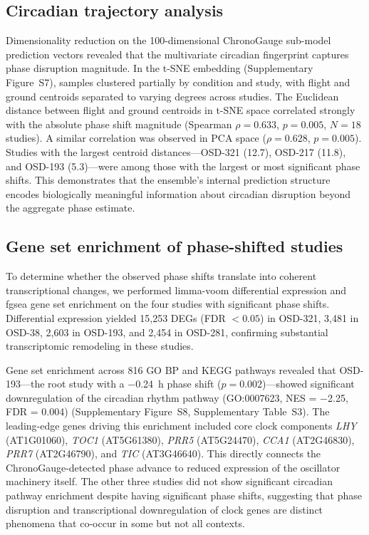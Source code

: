 \documentclass[11pt,a4paper]{article}
\begin{document}
\subsection*{Circadian trajectory analysis}

Dimensionality reduction on the 100-dimensional ChronoGauge sub-model prediction vectors revealed that the multivariate circadian fingerprint captures phase disruption magnitude. In the t-SNE embedding (Supplementary Figure~S7), samples clustered partially by condition and study, with flight and ground centroids separated to varying degrees across studies. The Euclidean distance between flight and ground centroids in t-SNE space correlated strongly with the absolute phase shift magnitude (Spearman $\rho = 0.633$, $p = 0.005$, $N = 18$ studies). A similar correlation was observed in PCA space ($\rho = 0.628$, $p = 0.005$). Studies with the largest centroid distances---OSD-321 (12.7), OSD-217 (11.8), and OSD-193 (5.3)---were among those with the largest or most significant phase shifts. This demonstrates that the ensemble's internal prediction structure encodes biologically meaningful information about circadian disruption beyond the aggregate phase estimate.

\subsection*{Gene set enrichment of phase-shifted studies}

To determine whether the observed phase shifts translate into coherent transcriptional changes, we performed limma-voom differential expression and fgsea gene set enrichment on the four studies with significant phase shifts. Differential expression yielded 15,253 DEGs (FDR $< 0.05$) in OSD-321, 3,481 in OSD-38, 2,603 in OSD-193, and 2,454 in OSD-281, confirming substantial transcriptomic remodeling in these studies.

Gene set enrichment across 816 GO BP and KEGG pathways revealed that OSD-193---the root study with a $-$0.24~h phase shift ($p = 0.002$)---showed significant downregulation of the circadian rhythm pathway (GO:0007623, NES = $-$2.25, FDR = 0.004) (Supplementary Figure~S8, Supplementary Table~S3). The leading-edge genes driving this enrichment included core clock components \textit{LHY} (AT1G01060), \textit{TOC1} (AT5G61380), \textit{PRR5} (AT5G24470), \textit{CCA1} (AT2G46830), \textit{PRR7} (AT2G46790), and \textit{TIC} (AT3G46640). This directly connects the ChronoGauge-detected phase advance to reduced expression of the oscillator machinery itself. The other three studies did not show significant circadian pathway enrichment despite having significant phase shifts, suggesting that phase disruption and transcriptional downregulation of clock genes are distinct phenomena that co-occur in some but not all contexts.
\end{document}
